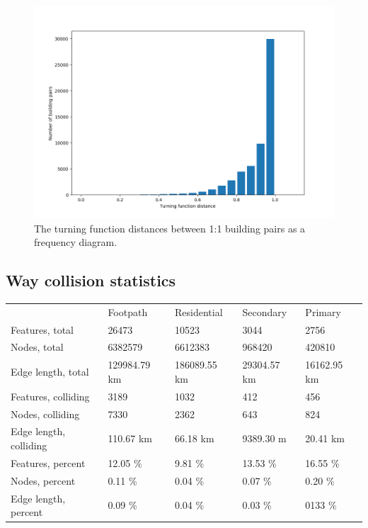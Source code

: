 \documentclass[a4paper]{article}
\begin{document}
\begin{figure}[H]
    \centering
    \includegraphics[width=\textwidth,height=0.5\textheight,keepaspectratio]{img_turning_function_plot}
    \caption{The turning function distances between 1:1 building pairs as a frequency diagram.}
    \label{fig:space}
\end{figure}


\subsection{Way collision statistics}

\begin{table}[H]
\begin{tabular}{lllll}
                            & Footpath      & Residential  & Secondary   & Primary     \\
    Features, total         & 26473         & 10523        & 3044        & 2756        \\
    Nodes, total            & 6382579       & 6612383      & 968420      & 420810      \\
    Edge length, total      & 129984.79 km  & 186089.55 km & 29304.57 km & 16162.95 km \\
    Features, colliding     & 3189          & 1032         & 412         & 456         \\
    Nodes, colliding        & 7330          & 2362         & 643         & 824         \\
    Edge length, colliding  & 110.67 km     & 66.18 km     & 9389.30 m   & 20.41 km    \\
    Features, percent       & 12.05 \%      & 9.81 \%      & 13.53 \%    & 16.55 \%    \\
    Nodes, percent          & 0.11 \%       & 0.04 \%      & 0.07 \%     & 0.20 \%     \\
    Edge length, percent    & 0.09 \%       & 0.04 \%      & 0.03 \%     & 0133 \%

\end{tabular}
\end{table}
\end{document}
